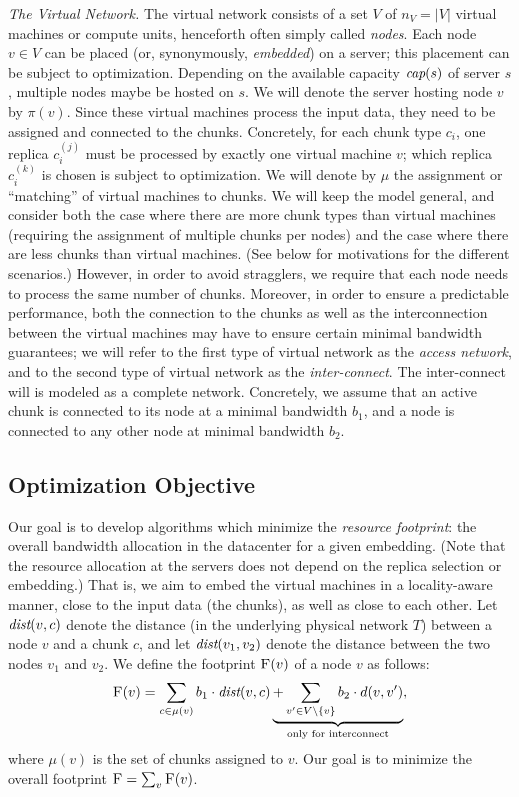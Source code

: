 \documentclass[9pt,twocolumn]{scrartcl}
\newcommand{\VirtualNodes}{\ensuremath{V}}
\newcommand{\achunk}{\ensuremath{c}}
\newcommand{\capacity}{\emph{cap}}
\newcommand{\dist}{\emph{dist}}
\newcommand{\Cost}{\textsc{F}}
\newcommand{\Tree}{\ensuremath{T}}
\newcommand{\CostTrans}{\ensuremath{b_1}}
\newcommand{\CostCom}{\ensuremath{b_2}}
\begin{document}
\emph{The Virtual Network.} The virtual network consists of a set $\VirtualNodes$ of $n_V=|\VirtualNodes|$ virtual machines or compute
 units, henceforth often simply called \emph{nodes}.
Each node $v \in \VirtualNodes$ can be placed (or, synonymously, \emph{embedded}) on a server; this placement can be subject
to optimization.
Depending on the available capacity $\capacity(s)$ of server $s$, multiple nodes maybe be hosted on $s$.
We will denote the server hosting node $v$ by $\pi(v)$.
Since these virtual machines process the input data, they need to be assigned and connected to the
chunks. Concretely, for each chunk type $\achunk_i$, one replica $\achunk_{i}^{(j)}$ must be processed by exactly one virtual machine $v$;
which replica $\achunk_{i}^{(k)}$ is chosen is subject to optimization.
We will denote by $\mu$ the assignment or ``matching'' of virtual machines to chunks.
We will keep the model general, and consider both the case where there are more chunk types
than virtual machines (requiring the assignment of multiple chunks per nodes) and the case
where there are less chunks than virtual machines. (See below for motivations for the different scenarios.)
However, in order to avoid stragglers, we require that each node needs to process the same number of chunks.
Moreover, in order to ensure a predictable performance, both the connection to the chunks
as well as the interconnection between the virtual machines may have to ensure certain
minimal bandwidth guarantees; we will refer to the first type of virtual network as the \emph{access
network}, and to the second type of virtual network as the \emph{inter-connect}. The inter-connect will
is modeled as a complete network. Concretely, we assume that an  active chunk
is connected to its node at a minimal bandwidth $\CostTrans$, and a node is connected to any other node
at minimal bandwidth $\CostCom$.


\subsection{Optimization Objective}

Our goal is to develop algorithms which minimize
the \emph{resource footprint}: the overall bandwidth allocation in the datacenter for a given embedding. (Note that
the resource allocation at the servers does not depend on the replica selection or embedding.) That is,
we aim to embed the virtual machines in a locality-aware manner, close to the input data
(the chunks), as well as close to
each other. Let $\dist(v,\achunk)$ denote the distance (in the underlying physical network $\Tree$) between a node $v$ and a
chunk $\achunk$, and let $\dist(v_1,v_2)$ denote the distance between the two nodes $v_1$ and $v_2$.
We define the footprint $\Cost(v)$ of a node $v$ as follows:
$$
\Cost(v) = \sum_{\achunk\in \mu(v)} \CostTrans \cdot \dist(v,\achunk) \underbrace{+ \sum_{v' \in \VirtualNodes\setminus\{v\}} \CostCom \cdot d(v,v')}_{\text{only for interconnect}},
$$
\noindent where $\mu(v)$ is the set of chunks assigned to $v$. Our goal is to minimize the overall footprint
$\Cost=\sum_v \Cost(v)$.
\end{document}
